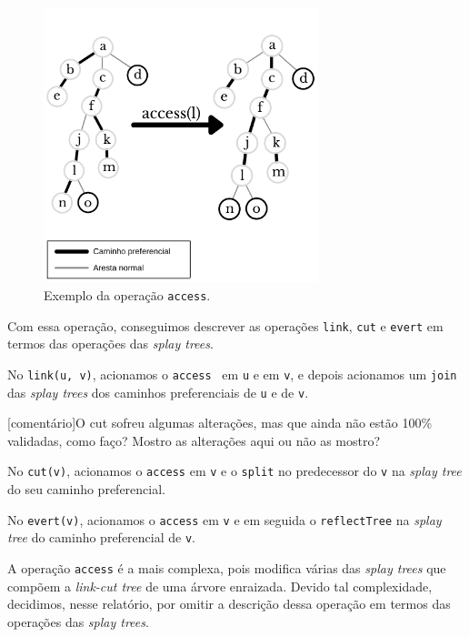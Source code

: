 \begin{figure}[htb]
    \centering
    \includegraphics[width=8cm]{figura2.png}
    \caption{Exemplo da operação \texttt{access}.}
    \label{fig:access}
\end{figure}


Com essa operação, conseguimos descrever as operações \texttt{link}, \texttt{cut} e \texttt{evert} em termos das operações das \emph{splay trees}.  

No \texttt{link(u, v)}, acionamos o \texttt{access}~\cite{wiki:LinkCutTree} em \texttt{u} e em \texttt{v}, e depois acionamos um \texttt{join} das \emph{splay trees} dos caminhos preferenciais de \texttt{u} e de \texttt{v}.  

{\color{red}[comentário]O cut sofreu algumas alterações, mas que ainda não estão 100\% validadas, como faço? Mostro as alterações aqui ou não as mostro?}

No \texttt{cut(v)}, acionamos o \texttt{access} em \texttt{v} e o \texttt{split} no predecessor do \texttt{v} na \emph{splay tree} do seu caminho preferencial.  

No \texttt{evert(v)}, acionamos o \texttt{access} em \texttt{v} e em seguida o \texttt{reflectTree} na \emph{splay tree} do caminho preferencial de \texttt{v}.  

A operação \texttt{access} é a mais complexa, pois modifica várias das \emph{splay trees} que compõem a \emph{link-cut tree} de uma árvore enraizada. Devido tal complexidade, decidimos, nesse relatório, por omitir a descrição dessa operação em termos das operações das \emph{splay trees}.  

